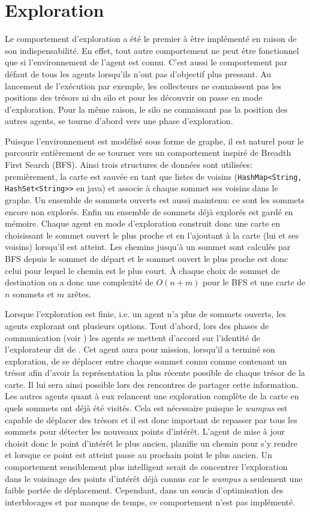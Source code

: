 \documentclass[11pt]{article}
\begin{document}
\section{Exploration}
Le comportement d'exploration a été le premier à être implémenté en raison de son indispensabilité. En effet, tout autre comportement ne peut être fonctionnel que si l'environnement de l'agent est connu. C'est aussi le comportement par défaut de tous les agents lorsqu'ils n'ont pas d'objectif plus pressant. Au lancement de l'exécution par exemple, les collecteurs ne connaissent pas les positions des trésors ni du silo et pour les découvrir on passe en mode d'exploration. Pour la même raison, le silo ne connaissant pas la position des autres agents, se tourne d'abord vers une phase d'exploration.

Puisque l'environnement est modélisé sous forme de graphe, il est naturel pour le parcourir entièrement de se tourner vers un comportement inspiré de Breadth First Search (BFS). Ainsi trois structures de données sont utilisées: premièrement, la carte est sauvée en tant que listes de voisins (\texttt{HashMap<String, HashSet<String>{}>} en java) et associe à chaque sommet ses voisins dans le graphe. Un ensemble de sommets ouverts est aussi maintenu: ce sont les sommets encore non explorés. Enfin un ensemble de sommets déjà explorés est gardé en mémoire. Chaque agent en mode d'exploration construit donc une carte en choisissant le sommet ouvert le plus proche et en l'ajoutant à la carte (lui et ses voisins)  lorsqu'il est atteint. Les chemins jusqu'à un sommet sont calculés par BFS depuis le sommet de départ et le sommet ouvert le plus proche est donc celui pour lequel le chemin est le plus court. À chaque choix de sommet de destination on a donc une complexité de $O(n + m)$ pour le BFS et une carte de $n$ sommets et $m$ arêtes.

Lorsque l'exploration est finie, i.e. un agent n'a plus de sommets ouverts, les agents explorant ont plusieurs options. Tout d'abord, lors des phases de communication (voir ) les agents se mettent d'accord sur l'identité de l'explorateur dit de . Cet agent aura pour mission, lorsqu'il a terminé son exploration, de se déplacer entre chaque sommet connu comme contenant un trésor afin d'avoir la représentation la plus récente possible de chaque trésor de la carte. Il lui sera ainsi possible lors des rencontres de partager cette information. Les autres agents quant à eux relancent une exploration complète de la carte en  quels sommets ont déjà été visités. Cela est nécessaire puisque le \textit{wumpus} est capable de déplacer des trésors et il est donc important de repasser par tous les sommets pour détecter les nouveaux points d'intérêt. L'agent de mise à jour choisit donc le point d'intérêt le plus ancien, planifie un chemin pour s'y rendre et lorsque ce point est atteint passe au prochain point le plus ancien. Un comportement sensiblement plus intelligent serait de concentrer l'exploration dans le voisinage des points d'intérêt déjà connus car le \textit{wumpus} a seulement une faible portée de déplacement. Cependant, dans un soucis d'optimisation des interblocages et par manque de temps, ce comportement n'est pas implémenté.
\end{document}

